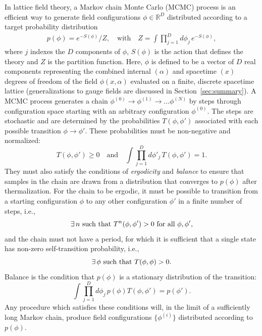 In lattice field theory, a Markov chain Monte Carlo (MCMC) process is an efficient way to generate field configurations $\phi \in \mathbb{R}^D$ distributed according to a target probability distribution
\begin{equation}
\begin{aligned}
    p(\phi) = e^{-S(\phi)} / Z, \quad
    \text{with}\quad Z =\int \prod_{j=1}^D d\phi_j \,e^{-S(\phi)},
\end{aligned}
\end{equation}
where $j$ indexes the $D$ components of $\phi$, $S(\phi)$ is the action that defines the theory and $Z$ is the partition function. Here, $\phi$ is defined to be a vector of $D$ real components representing the combined internal $(\alpha)$ and spacetime $(x)$ degrees of freedom of the field $\phi(x,\alpha)$ evaluated on a finite, discrete spacetime lattice (generalizations to gauge fields are discussed in Section~\ref{sec:summary}). A MCMC process generates a chain $\phi^{(0)} \rightarrow \phi^{(1)} \rightarrow \ldots \phi^{(N)}$ by steps through configuration space starting with an arbitrary configuration $\phi^{(0)}$. The steps are stochastic and are determined by the probabilities $T(\phi,\phi')$ associated with each possible transition $\phi \rightarrow \phi'$.
These probabilities must be non-negative and normalized:
%
\begin{equation}
    T(\phi,\phi')\ge 0
    \quad \text{and} \quad
    \int\prod_{j=1}^D d\phi'_j \, T(\phi,\phi') = 1.
\end{equation}
%
They must also satisfy the conditions of {\it ergodicity} and {\it balance} to ensure that samples in the chain are drawn from a distribution that converges to $p(\phi)$ after thermalization. For the chain to be ergodic, it must be possible to transition from a starting configuration $\phi$ to any other configuration $\phi'$ in a finite number of steps, i.e.,
%
\begin{equation}
    \operatorname{\exists} n \text{ such that } T^n(\phi,\phi')> 0 \text{ for all } \phi, \phi',
\end{equation}
%
%
and the chain must not have a period, for which it is sufficient that a single state has non-zero self-transition probability, i.e.,
%
\begin{equation}
    \operatorname{\exists} \phi \text{ such that } T(\phi,\phi) > 0.
\end{equation}
%
Balance is the condition that $p(\phi)$ is a stationary distribution of the transition:
%
\begin{equation}
    \int \prod_{j=1}^D d\phi_j \, p(\phi) T(\phi,\phi') = p(\phi').
\end{equation}
%
Any procedure which satisfies these conditions will, in the limit of a sufficiently long Markov chain, produce field configurations $\{\phi^{(i)}\}$ distributed according to $p(\phi)$.

